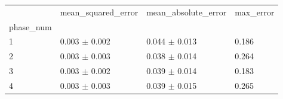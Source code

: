 \begin{tabular}{llll}
\toprule
 & mean_squared_error & mean_absolute_error & max_error \\
phase_num &  &  &  \\
\midrule
1 & 0.003 $\pm$ 0.002 & 0.044 $\pm$ 0.013 & 0.186 \\
2 & 0.003 $\pm$ 0.003 & 0.038 $\pm$ 0.014 & 0.264 \\
3 & 0.003 $\pm$ 0.002 & 0.039 $\pm$ 0.014 & 0.183 \\
4 & 0.003 $\pm$ 0.003 & 0.039 $\pm$ 0.015 & 0.265 \\
\bottomrule
\end{tabular}

